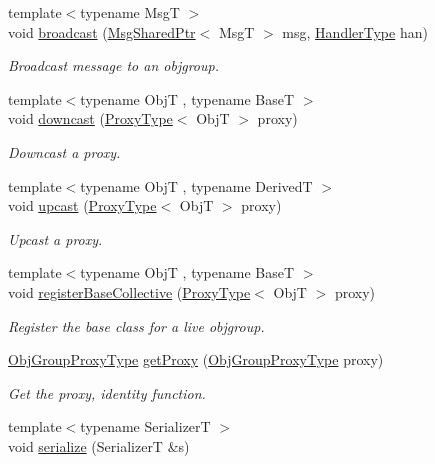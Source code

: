 \begin{DoxyCompactItemize}
{\footnotesize template$<$typename MsgT $>$ }\\void \hyperlink{structvt_1_1objgroup_1_1_obj_group_manager_a4bd17271d7a5d298ac74c73eedde4d8d}{broadcast} (\hyperlink{namespacevt_ab2b3d506ec8e8d1540aede826d84a239}{Msg\+Shared\+Ptr}$<$ MsgT $>$ msg, \hyperlink{namespacevt_af64846b57dfcaf104da3ef6967917573}{Handler\+Type} han)
\begin{DoxyCompactList}\small\item\em Broadcast message to an objgroup. \end{DoxyCompactList}\item 
{\footnotesize template$<$typename ObjT , typename BaseT $>$ }\\void \hyperlink{structvt_1_1objgroup_1_1_obj_group_manager_ab7ea99ad2668a99debd687a20bb9e3dd}{downcast} (\hyperlink{structvt_1_1objgroup_1_1_obj_group_manager_aea65eef52f240a52210132eef5ce591f}{Proxy\+Type}$<$ ObjT $>$ proxy)
\begin{DoxyCompactList}\small\item\em Downcast a proxy. \end{DoxyCompactList}\item 
{\footnotesize template$<$typename ObjT , typename DerivedT $>$ }\\void \hyperlink{structvt_1_1objgroup_1_1_obj_group_manager_abddd0f80c5b0f625a4ed487414c3b39b}{upcast} (\hyperlink{structvt_1_1objgroup_1_1_obj_group_manager_aea65eef52f240a52210132eef5ce591f}{Proxy\+Type}$<$ ObjT $>$ proxy)
\begin{DoxyCompactList}\small\item\em Upcast a proxy. \end{DoxyCompactList}\item 
{\footnotesize template$<$typename ObjT , typename BaseT $>$ }\\void \hyperlink{structvt_1_1objgroup_1_1_obj_group_manager_a6e869a6e38c7fe4e176814ca93ecf36e}{register\+Base\+Collective} (\hyperlink{structvt_1_1objgroup_1_1_obj_group_manager_aea65eef52f240a52210132eef5ce591f}{Proxy\+Type}$<$ ObjT $>$ proxy)
\begin{DoxyCompactList}\small\item\em Register the base class for a live objgroup. \end{DoxyCompactList}\item 
\hyperlink{namespacevt_ad7cae989df485fccca57f0792a880a8e}{Obj\+Group\+Proxy\+Type} \hyperlink{structvt_1_1objgroup_1_1_obj_group_manager_a9569c5ad1c032a90573bd987c64f560a}{get\+Proxy} (\hyperlink{namespacevt_ad7cae989df485fccca57f0792a880a8e}{Obj\+Group\+Proxy\+Type} proxy)
\begin{DoxyCompactList}\small\item\em Get the proxy, identity function. \end{DoxyCompactList}\item 
{\footnotesize template$<$typename SerializerT $>$ }\\void \hyperlink{structvt_1_1objgroup_1_1_obj_group_manager_a218394ac115ac9f61d8858b54e06520a}{serialize} (SerializerT \&s)
\end{DoxyCompactItemize}
